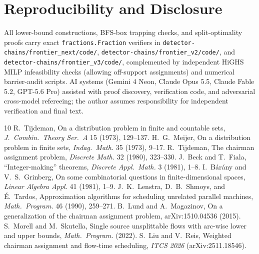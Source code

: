 \documentclass[11pt]{article}
\theoremstyle{definition}
\begin{document}
\section*{Reproducibility and Disclosure}
All lower-bound constructions, BFS-box trapping checks, and split-optimality proofs carry exact \texttt{fractions.Fraction} verifiers in \texttt{detector-chains/frontier\_next/code/}, \texttt{detector-chains/frontier\_v2/code/}, and \texttt{detector-chains/frontier\_v3/code/}, complemented by independent HiGHS MILP infeasibility checks (allowing off-support assignments) and numerical barrier-audit scripts. AI systems (Gemini 4 Neon, Claude Opus 5.5, Claude Fable 5.2, GPT-5.6 Pro) assisted with proof discovery, verification code, and adversarial cross-model refereeing; the author assumes responsibility for independent verification and final text.

\begin{thebibliography}{10}
 R.~Tijdeman, On a distribution problem in finite and countable sets, \emph{J.\ Combin.\ Theory Ser.\ A} 15 (1973), 129--137.
 H.~G.~Meijer, On a distribution problem in finite sets, \emph{Indag.\ Math.} 35 (1973), 9--17.
 R.~Tijdeman, The chairman assignment problem, \emph{Discrete Math.} 32 (1980), 323--330.
 J.~Beck and T.~Fiala, ``Integer-making'' theorems, \emph{Discrete Appl.\ Math.} 3 (1981), 1--8.
 I.~B\'ar\'any and V.~S.~Grinberg, On some combinatorial questions in finite-dimensional spaces, \emph{Linear Algebra Appl.} 41 (1981), 1--9.
 J.~K.~Lenstra, D.~B.~Shmoys, and \'E.~Tardos, Approximation algorithms for scheduling unrelated parallel machines, \emph{Math.\ Program.} 46 (1990), 259--271.
 B.~Lund and A.~Magazinov, On a generalization of the chairman assignment problem, arXiv:1510.04536 (2015).
 S.~Morell and M.~Skutella, Single source unsplittable flows with arc-wise lower and upper bounds, \emph{Math.\ Program.} (2022).
 S.~Liu and V.~Reis, Weighted chairman assignment and flow-time scheduling, \emph{ITCS 2026} (arXiv:2511.18546).
\end{thebibliography}
\end{document}
